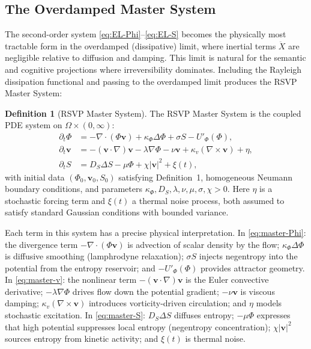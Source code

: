 \documentclass[12pt, a4paper]{article}
\theoremstyle{plain}
\theoremstyle{definition}
\newtheorem{definition}[theorem]{Definition}
\theoremstyle{remark}
\newcommand{\vfield}{\mathbf{v}}
\begin{document}
\subsection{The Overdamped Master System}

The second-order system \eqref{eq:EL-Phi}--\eqref{eq:EL-S} becomes the physically most
tractable form in the overdamped (dissipative) limit, where inertial terms $\ddot{X}$ are
negligible relative to diffusion and damping.  This limit is natural for the semantic and
cognitive projections where irreversibility dominates.  Including the Rayleigh dissipation
functional and passing to the overdamped limit produces the RSVP Master System:

\begin{definition}[RSVP Master System]
\label{def:master}
The RSVP Master System is the coupled PDE system on $\Omega\times(0,\infty)$:
\begin{align}
\partial_t\Phi &= -\nabla\cdot(\Phi\vfield) + \kappa_\Phi\Delta\Phi + \sigma S - U'_\Phi(\Phi),
\label{eq:master-Phi}\\
\partial_t\vfield &= -(\vfield\cdot\nabla)\vfield - \lambda\nabla\Phi - \nu\vfield
                    + \kappa_v(\nabla\times\vfield) + \eta,
\label{eq:master-v}\\
\partial_t S &= D_S\Delta S - \mu\Phi + \chi|\vfield|^2 + \xi(t),
\label{eq:master-S}
\end{align}
with initial data $(\Phi_0, \vfield_0, S_0)$ satisfying Definition~1, homogeneous Neumann
boundary conditions, and parameters $\kappa_\Phi, D_S, \lambda, \nu, \mu, \sigma, \chi > 0$.
Here $\eta$ is a stochastic forcing term and $\xi(t)$ a thermal noise process, both
assumed to satisfy standard Gaussian conditions with bounded variance.
\end{definition}

Each term in this system has a precise physical interpretation.  In
\eqref{eq:master-Phi}: the divergence term $-\nabla\cdot(\Phi\vfield)$ is advection of
scalar density by the flow; $\kappa_\Phi\Delta\Phi$ is diffusive smoothing (lamphrodyne
relaxation); $\sigma S$ injects negentropy into the potential from the entropy reservoir;
and $-U'_\Phi(\Phi)$ provides attractor geometry.  In \eqref{eq:master-v}: the
nonlinear term $-(\vfield\cdot\nabla)\vfield$ is the Euler convective derivative;
$-\lambda\nabla\Phi$ drives flow down the potential gradient; $-\nu\vfield$ is viscous
damping; $\kappa_v(\nabla\times\vfield)$ introduces vorticity-driven circulation; and
$\eta$ models stochastic excitation.  In \eqref{eq:master-S}: $D_S\Delta S$ diffuses
entropy; $-\mu\Phi$ expresses that high potential suppresses local entropy (negentropy
concentration); $\chi|\vfield|^2$ sources entropy from kinetic activity; and $\xi(t)$
is thermal noise.
\end{document}
